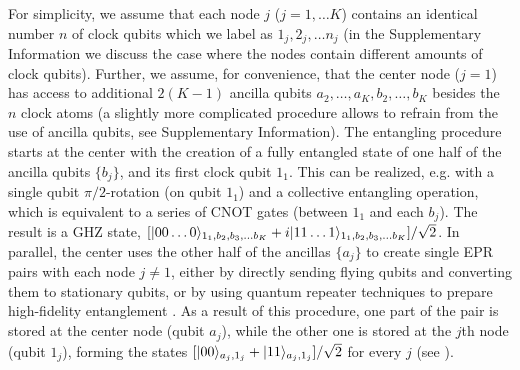 For simplicity, we assume that each node $j$ ($j=1,\dots K$) contains an
identical number $n$ of clock qubits which we label as $1_j, 2_j,\dots n_j$ (in
the Supplementary Information we discuss the case where the nodes contain
different amounts of clock qubits).
Further, we assume, for convenience, that the center node ($j=1$) has access to
additional $2(K-1)$ ancilla qubits $a_2,\dots, a_K,b_2,\dots,b_K$ besides the
$n$ clock atoms (a slightly more complicated procedure allows to refrain from
the use of ancilla qubits, see Supplementary Information).
The entangling procedure starts at the center with the creation of a fully
entangled state of one half of the ancilla qubits $\{b_j\}$, and its first clock
qubit $1_1$. 
This can be realized, e.g.  with a single qubit $\pi/2$-rotation
(on qubit $1_1$)
and a collective entangling operation, which is equivalent to a series of
CNOT gates \cite{Nielsen:2000vn} (between $1_1$ and each $b_j$).
The result is a GHZ state, $[| 00\dots 0 \rangle_{1_1,b_2,b_3,\dots b_K} +
i| 11\dots 1 \rangle_{1_1,b_2,b_3,\dots b_K}]/\sqrt{2}$.
In parallel, the center uses the other half of the ancillas $\{a_j\}$ to create single EPR pairs with each node $j\neq1$,
either by directly sending flying qubits and converting them to stationary
qubits, or by using quantum repeater techniques to prepare high-fidelity entanglement \cite{Duan2001}. As a result of this procedure, 
one part of the pair is stored at the center node (qubit $a_j$), while the other one
is stored at the $j$th  node (qubit $1_j$), forming the states $[| 00 \rangle_{a_j,1_j} +
| 11 \rangle_{a_j,1_j}]/\sqrt{2}$ for every $j$ (see ).
